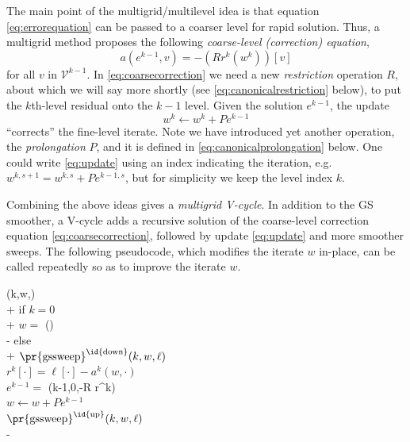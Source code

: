 \documentclass[letterpaper,final,12pt,reqno]{amsart}
\numberwithin{equation}{section}
\numberwithin{figure}{section}
\numberwithin{table}{section}
\begin{document}
The main point of the multigrid/multilevel idea is that equation \eqref{eq:errorequation} can be passed to a coarser level for rapid solution.  Thus, a multigrid method proposes the following \emph{coarse-level (correction) equation},
\begin{equation}
  a(e^{k-1},v) = - (Rr^k(w^k))[v]  \label{eq:coarsecorrection}
\end{equation}
for all $v$ in $\mathcal{V}^{k-1}$.  In \eqref{eq:coarsecorrection} we need a new \emph{restriction} operation $R$, about which we will say more shortly (see \eqref{eq:canonicalrestriction} below), to put the $k$th-level residual onto the $k-1$ level.  Given the solution $e^{k-1}$, the update
\begin{equation}
  w^k \gets w^k + P e^{k-1}  \label{eq:update}
\end{equation}
``corrects'' the fine-level iterate.  Note we have introduced yet another operation, the \emph{prolongation} $P$, and it is defined in \eqref{eq:canonicalprolongation} below.  One could write \eqref{eq:update} using an index indicating the iteration, e.g.~$w^{k,s+1} = w^{k,s} + Pe^{k-1,s}$, but for simplicity we keep the level index $k$.

Combining the above ideas gives a \emph{multigrid V-cycle}.  In addition to the GS smoother, a V-cycle adds a recursive solution of the coarse-level correction equation \eqref{eq:coarsecorrection}, followed by update \eqref{eq:update} and more smoother sweeps.  The following pseudocode, which modifies the iterate $w$ in-place, can be called repeatedly so as to improve the iterate $w$.

\begin{pseudo*}
(k,w,\ell)\text{:} \\+
    if $k=0$ \\+
        $w =$ (\ell) \\-  %
    else \\+
        $\text{\pr{gssweep}}^{\text{\id{down}}}(k,w,\ell)$ \\
        $r^k[\cdot] = \ell[\cdot] - a^k(w,\cdot)$ \\
        $e^{k-1} =$ (k-1,0,-R r^k) \\
        $w \gets w + P e^{k-1}$ \\
        $\text{\pr{gssweep}}^{\text{\id{up}}}(k,w,\ell)$ \\-
\end{pseudo*}
\end{document}
